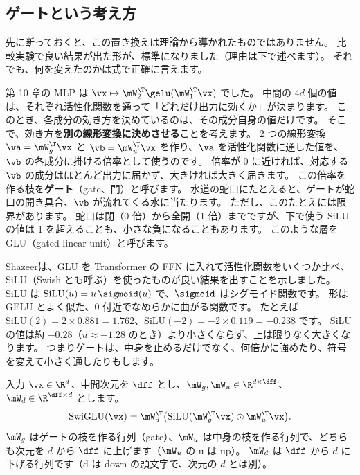 \subsection*{ゲートという考え方}

先に断っておくと、この置き換えは理論から導かれたものではありません。
比較実験で良い結果が出た形が、標準になりました（理由は下で述べます）。
それでも、何を変えたのかは式で正確に言えます。

第 10 章の MLP は $\vx\mapsto\mW_2^\T\gelu(\mW_1^\T\vx)$ でした。
中間の $4d$ 個の値は、それぞれ活性化関数を通って「どれだけ出力に効くか」が決まります。
このとき、各成分の効き方を決めているのは、その成分自身の値だけです。
そこで、効き方を\textbf{別の線形変換に決めさせる}ことを考えます。
2 つの線形変換 $\va=\mW_g^\T\vx$ と $\vb=\mW_u^\T\vx$ を作り、$\va$ を活性化関数に通した値を、$\vb$ の各成分に掛ける倍率として使うのです。
倍率が 0 に近ければ、対応する $\vb$ の成分はほとんど出力に届かず、大きければ大きく届きます。
この倍率を作る枝を\textbf{ゲート}（gate、門）と呼びます。
水道の蛇口にたとえると、ゲートが蛇口の開き具合、$\vb$ が流れてくる水に当たります。
ただし、このたとえには限界があります。
蛇口は閉（0 倍）から全開（1 倍）までですが、下で使う SiLU の値は 1 を超えることも、小さな負になることもあります。
このような層を GLU（gated linear unit）と呼びます。

Shazeer\cite{shazeer2020glu}は、GLU を Transformer の FFN に入れて活性化関数をいくつか比べ、SiLU（Swish とも呼ぶ）を使ったものが良い結果を出すことを示しました。
SiLU は $\mathrm{SiLU}(u)=u\,\sigmoid(u)$ で、$\sigmoid$ はシグモイド関数です。
形は GELU とよく似た、0 付近でなめらかに曲がる関数です。
たとえば $\mathrm{SiLU}(2)=2\times0.881=1.762$、$\mathrm{SiLU}(-2)=-2\times0.119=-0.238$ です。
SiLU の値は約 $-0.28$（$u\approx-1.28$ のとき）より小さくならず、上は限りなく大きくなります。
つまりゲートは、中身を止めるだけでなく、何倍かに強めたり、符号を変えて小さく通したりもします。

\begin{definition}
入力 $\vx\in\R^d$、中間次元を $\dff$ とし、$\mW_g,\mW_u\in\R^{d\times\dff}$、$\mW_d\in\R^{\dff\times d}$ とします。
\begin{equation}
\mathrm{SwiGLU}(\vx)=\mW_d^\T\bigl(\mathrm{SiLU}(\mW_g^\T\vx)\odot\mW_u^\T\vx\bigr).
\label{eq:ma-swiglu}
\end{equation}
$\mW_g$ はゲートの枝を作る行列（gate）、$\mW_u$ は中身の枝を作る行列で、どちらも次元を $d$ から $\dff$ に上げます（$\mW_u$ の u は up）。
$\mW_d$ は $\dff$ から $d$ に下げる行列です（d は down の頭文字で、次元の $d$ とは別）。
\end{definition}

